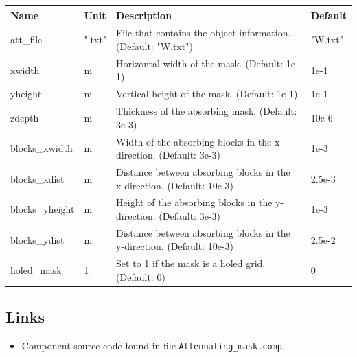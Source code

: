 \begin{longtable}{p{}p{}p{}p{}}
\toprule
\textbf{Name} & \textbf{Unit} & \textbf{Description} & \textbf{Default} \\
\midrule
\endhead
att\_file & ".txt" & File that contains the object information. (Default: "W.txt") & "W.txt" \\
xwidth & m & Horizontal width of the mask. (Default: 1e-1) & 1e-1 \\
yheight & m & Vertical height of the mask. (Default: 1e-1) & 1e-1 \\
zdepth & m & Thickness of the absorbing mask. (Default: 3e-3) & 10e-6 \\
blocks\_xwidth & m & Width of the absorbing blocks in the x-direction. (Default: 3e-3) & 1e-3 \\
blocks\_xdist & m & Distance between absorbing blocks in the x-direction. (Default: 10e-3) & 2.5e-3 \\
blocks\_yheight & m & Height of the absorbing blocks in the y-direction. (Default: 3e-3) & 1e-3 \\
blocks\_ydist & m & Distance between absorbing blocks in the y-direction. (Default: 10e-3) & 2.5e-2 \\
holed\_mask & 1 & Set to 1 if the mask is a holed grid. (Default: 0) & 0 \\
\bottomrule
\end{longtable}

\subsection*{Links}
\begin{itemize}
  \item Component source code found in file \texttt{Attenuating\_mask.comp}.
\end{itemize}
